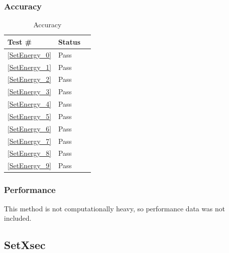 \documentclass[12pt]{article}
\begin{document}
	\subsubsection{Accuracy}
		\begin{table}[H]
		\centering
		\caption{Accuracy}\label{GetY_acc}
		\begin{tabular}{lll}
		\toprule
		\bf Test \# & Status \\\midrule
		\ref{SetEnergy_0} & Pass\\
		\ref{SetEnergy_1} & Pass\\
		\ref{SetEnergy_2} & Pass\\
		\ref{SetEnergy_3} & Pass\\
		\ref{SetEnergy_4} & Pass\\
		\ref{SetEnergy_5} & Pass\\
		\ref{SetEnergy_6} & Pass\\
		\ref{SetEnergy_7} & Pass\\
		\ref{SetEnergy_8} & Pass\\
		\ref{SetEnergy_9} & Pass\\
		\bottomrule
		\end{tabular}
		\end{table}
	\subsubsection{Performance}
		This method is not computationally heavy, so performance data was not included.

\subsection{SetXsec}
\end{document}
